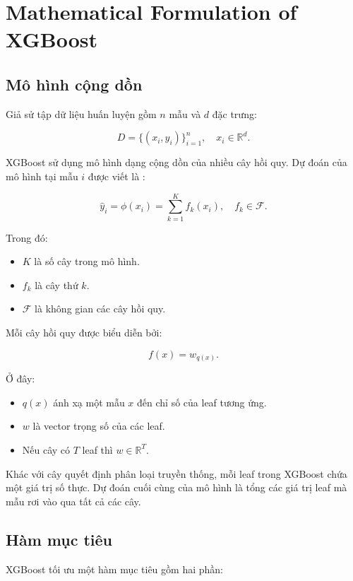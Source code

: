 \section{Mathematical Formulation of XGBoost}

\subsection{Mô hình cộng dồn}

Giả sử tập dữ liệu huấn luyện gồm $n$ mẫu và $d$ đặc trưng:

\[
D = \{(x_i, y_i)\}_{i=1}^{n},
\quad x_i \in \mathbb{R}^{d}.
\]

XGBoost sử dụng mô hình dạng cộng dồn của nhiều cây hồi quy. Dự đoán của mô hình tại mẫu $i$ được viết là \cite{chen2016xgboost}:

\[
\hat{y}_i = \phi(x_i) = \sum_{k=1}^{K} f_k(x_i),
\quad f_k \in \mathcal{F}.
\]

Trong đó:

\begin{itemize}
    \item $K$ là số cây trong mô hình.
    \item $f_k$ là cây thứ $k$.
    \item $\mathcal{F}$ là không gian các cây hồi quy.
\end{itemize}

Mỗi cây hồi quy được biểu diễn bởi:

\[
f(x) = w_{q(x)}.
\]

Ở đây:

\begin{itemize}
    \item $q(x)$ ánh xạ một mẫu $x$ đến chỉ số của leaf tương ứng.
    \item $w$ là vector trọng số của các leaf.
    \item Nếu cây có $T$ leaf thì $w \in \mathbb{R}^{T}$.
\end{itemize}

Khác với cây quyết định phân loại truyền thống, mỗi leaf trong XGBoost chứa một giá trị số thực. Dự đoán cuối cùng của mô hình là tổng các giá trị leaf mà mẫu rơi vào qua tất cả các cây.

\subsection{Hàm mục tiêu}

XGBoost tối ưu một hàm mục tiêu gồm hai phần:

